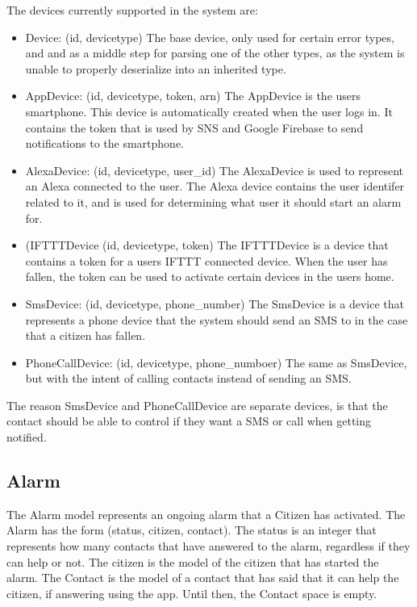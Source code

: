 The devices currently supported in the system are:
\begin{itemize}
    \item Device: (id, devicetype)
    The base device, only used for certain error types, and and as a middle step for parsing one of the other types, as the system is unable to properly deserialize into an inherited type.
    \item AppDevice: (id, devicetype, token, arn)
    The AppDevice is the users smartphone. This device is automatically created when the user logs in. It contains the token that is used by SNS and Google Firebase to send notifications to the smartphone.
    \item AlexaDevice: (id, devicetype, user\_id) 
    The AlexaDevice is used to represent an Alexa connected to the user. The Alexa device contains the user identifer related to it, and is used for determining what user it should start an alarm for.
    \item (IFTTTDevice (id, devicetype, token)
    The IFTTTDevice is a device that contains a token for a users IFTTT connected device. When the user has fallen, the token can be used to activate certain devices in the users home.
    \item SmsDevice: (id, devicetype, phone\_number) 
    The SmsDevice is a device that represents a phone device that the system should send an SMS to in the case that a citizen has fallen.
    \item PhoneCallDevice: (id, devicetype, phone\_numboer)
    The same as SmsDevice, but with the intent of calling contacts instead of sending an SMS.
\end{itemize}

The reason SmsDevice and PhoneCallDevice are separate devices, is that the contact should be able to control if they want a SMS or call when getting notified.

\subsection{Alarm}
The Alarm model represents an ongoing alarm that a Citizen has activated. The Alarm has the form (status, citizen, contact). The status is an integer that represents how many contacts that have answered to the alarm, regardless if they can help or not. The citizen is the model of the citizen that has started the alarm. The Contact is the model of a contact that has said that it can help the citizen, if answering using the app. Until then, the Contact space is empty.


